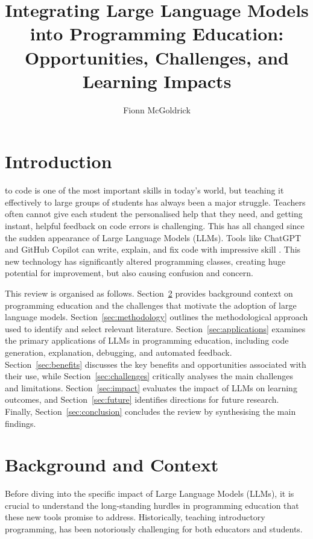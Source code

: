 \documentclass[10pt,journal,compsoc]{IEEEtran}
\title{Integrating Large Language Models into Programming Education: Opportunities, Challenges, and Learning Impacts}
\author{Fionn McGoldrick}
\begin{document}
\maketitle

\section{Introduction}
\label{sec:introduction}

 to code is one of the most important skills in today's world, but teaching it effectively to large groups of students has always been a major struggle. Teachers often cannot give each student the personalised help that they need, and getting instant, helpful feedback on code errors is challenging. This has all changed since the sudden appearance of Large Language Models (LLMs). Tools like ChatGPT and GitHub Copilot can write, explain, and fix code with impressive skill \cite{10.1145/3617367}. This new technology has significantly altered programming classes, creating huge potential for improvement, but also causing confusion and concern.


This review is organised as follows. Section~\ref{sec:background} provides background context on programming education and the challenges that motivate the adoption of large language models. Section~\ref{sec:methodology} outlines the methodological approach used to identify and select relevant literature. Section~\ref{sec:applications} examines the primary applications of LLMs in programming education, including code generation, explanation, debugging, and automated feedback. Section~\ref{sec:benefits} discusses the key benefits and opportunities associated with their use, while Section~\ref{sec:challenges} critically analyses the main challenges and limitations. Section~\ref{sec:impact} evaluates the impact of LLMs on learning outcomes, and Section~\ref{sec:future} identifies directions for future research. Finally, Section~\ref{sec:conclusion} concludes the review by synthesising the main findings.


\section{Background and Context}
\label{sec:background}
Before diving into the specific impact of Large Language Models (LLMs), it is crucial to understand the long-standing hurdles in programming education that these new tools promise to address. Historically, teaching introductory programming, has been notoriously challenging for both educators and students.
\end{document}
